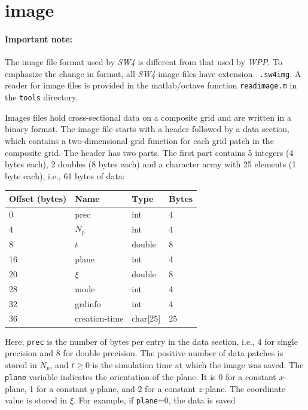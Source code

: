 \documentclass[11pt]{report}
\begin{document}
\section{image}\label{sec:image-format}

\paragraph{Important note:} The image file format used by \emph{SW4} is different from that used by
\emph{WPP}. To emphasize the change in format, all \emph{SW4} image files have extension {\tt
  .sw4img}. A reader for image files is provided in the matlab/octave function \verb+readimage.m+ in
the \verb+tools+ directory.

Images files hold cross-sectional data on a composite grid and are written in a binary format. The
image file starts with a header followed by a data section, which contains a two-dimensional grid
function for each grid patch in the composite grid. The header has two parts. The first part
contains 5 integers (4 bytes each), 2 doubles (8 bytes each) and a character array with 25 elements
(1 byte each), i.e., 61 bytes of data:
\begin{center}
\begin{tabular}{llll}\hline
Offset (bytes) & Name & Type & Bytes \\ \hline
0 & prec   & int & 4 \\ \hline
4 & $N_p$  & int & 4 \\ \hline
8 & $t$    & double & 8 \\ \hline
16 & plane & int & 4 \\ \hline
20 & $\xi$ & double & 8 \\ \hline
28 & mode  & int & 4 \\ \hline
32 & grdinfo & int & 4 \\ \hline
36 & creation-time & char[25] & 25 \\ \hline
\end{tabular}
\end{center}
Here, {\tt prec} is the number of bytes per entry in the data section, i.e., 4 for single precision
and 8 for double precision. The positive number of data patches is stored in $N_p$, and $t\geq 0$ is the
simulation time at which the image was saved. The {\tt plane} variable indicates the orientation of
the plane. It is 0 for a constant $x$-plane, 1 for a constant $y$-plane, and 2 for a constant
$z$-plane. The coordinate value is stored in $\xi$. For example, if {\tt plane}=0, the data is saved
\end{document}
